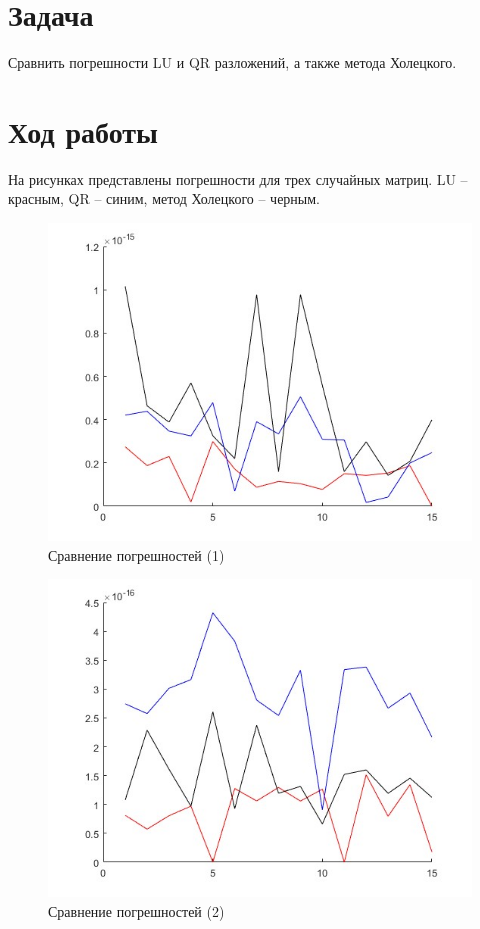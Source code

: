 \documentclass[a4paper,12pt]{article}
\begin{document}
	
	\section{Задача}
	Сравнить погрешности LU и QR разложений, а также метода Холецкого.
	\section{Ход работы}
	На рисунках представлены погрешности для трех случайных матриц. LU -- красным, QR -- синим,
	метод Холецкого -- черным.
	\begin{figure}[H]
		\centering
		\includegraphics[width=0.7\linewidth]{polytech/calc-math/report-lab3/subfiles/slau}
		\caption{Сравнение погрешностей (1)}
		\label{fig:graph}
	\end{figure}
	\begin{figure}[H]
		\centering
		\includegraphics[width=0.7\linewidth]{polytech/calc-math/report-lab3/subfiles/slau2}
		\caption{Сравнение погрешностей (2)}
		\label{fig:graph}
	\end{figure}
\end{document}

